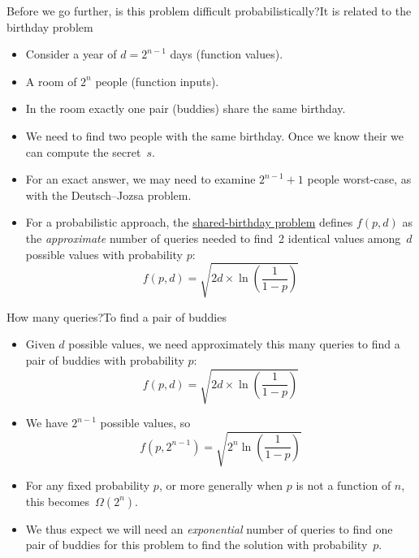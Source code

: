 \begin{frame}{Before we go further, is this problem difficult probabilistically?}{It is related to the birthday problem}

\begin{itemize}[<+->]
    \item Consider a year of $d=2^{n-1}$ days (function values).
    \item A room of $2^{n}$ people (function inputs).
    \item In the room exactly one pair (buddies) share the same birthday.
    \item We need to find two people with the same birthday.   Once we know their  we can compute the secret~$s$.
    \item For an exact answer, we may need to examine $2^{n-1}+1$ people worst-case, as with the Deutsch--Jozsa problem.
    \item For a probabilistic approach, the \href{https://en.wikipedia.org/wiki/Birthday_problem\#Probability_of_a_shared_birthday_(collision)}{shared-birthday problem} defines $f(p,d)$  as the \emph{approximate} number of queries needed to find~2 identical values among~$d$ possible values with probability $p$:
    \[ f(p,d)= \sqrt{2d\times \ln\left(\frac{1}{1-p}\right)}\]
\end{itemize}
\end{frame}

\begin{frame}{How many queries?}{To find a pair of buddies}
\Vskip{-3.5em}\begin{itemize}[<+->]
\item Given $d$ possible values, we need approximately this many queries to find a pair of buddies with probability $p$:
 \Vskip{-1em}\[ f(p,d)= \sqrt{2d\times \ln\left(\frac{1}{1-p}\right)}\]
\item We have $2^{n-1}$ possible values, so
\Vskip{-1em}\[ f(p,2^{n-1})= \sqrt{2^{n} \ln\left(\frac{1}{1-p}\right)}\]
\item For any fixed probability $p$, or more generally when $p$ is not a function of $n$, this becomes~$\Omega(2^n)$.
\item We thus expect we will need an \emph{exponential} number of queries to find one pair of buddies for this problem to find the solution with probability~$p$.
\end{itemize}

\end{frame}

